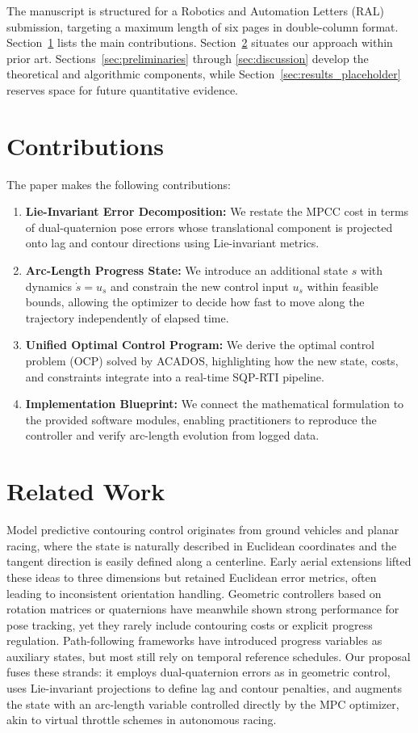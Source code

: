 \documentclass[letterpaper, 10pt, conference]{IEEEtran}
\begin{document}
The manuscript is structured for a Robotics and Automation Letters (RAL) submission, targeting a maximum length of six pages in double-column format. Section~\ref{sec:contributions} lists the main contributions. Section~\ref{sec:related_work} situates our approach within prior art. Sections~\ref{sec:preliminaries} through \ref{sec:discussion} develop the theoretical and algorithmic components, while Section~\ref{sec:results_placeholder} reserves space for future quantitative evidence.

\section{Contributions}
\label{sec:contributions}
The paper makes the following contributions:
\begin{enumerate}
    \item \textbf{Lie-Invariant Error Decomposition:} We restate the MPCC cost in terms of dual-quaternion pose errors whose translational component is projected onto lag and contour directions using Lie-invariant metrics.
    \item \textbf{Arc-Length Progress State:} We introduce an additional state $s$ with dynamics $\dot{s} = u_s$ and constrain the new control input $u_s$ within feasible bounds, allowing the optimizer to decide how fast to move along the trajectory independently of elapsed time.
    \item \textbf{Unified Optimal Control Program:} We derive the optimal control problem (OCP) solved by ACADOS, highlighting how the new state, costs, and constraints integrate into a real-time SQP-RTI pipeline.
    \item \textbf{Implementation Blueprint:} We connect the mathematical formulation to the provided software modules, enabling practitioners to reproduce the controller and verify arc-length evolution from logged data.
\end{enumerate}

\section{Related Work}
\label{sec:related_work}
Model predictive contouring control originates from ground vehicles and planar racing, where the state is naturally described in Euclidean coordinates and the tangent direction is easily defined along a centerline. Early aerial extensions lifted these ideas to three dimensions but retained Euclidean error metrics, often leading to inconsistent orientation handling. Geometric controllers based on rotation matrices or quaternions have meanwhile shown strong performance for pose tracking, yet they rarely include contouring costs or explicit progress regulation. Path-following frameworks have introduced progress variables as auxiliary states, but most still rely on temporal reference schedules. Our proposal fuses these strands: it employs dual-quaternion errors as in geometric control, uses Lie-invariant projections to define lag and contour penalties, and augments the state with an arc-length variable controlled directly by the MPC optimizer, akin to virtual throttle schemes in autonomous racing.
\end{document}
